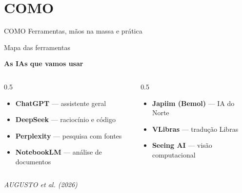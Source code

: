 \documentclass[11pt]{beamer}
\newcommand{\citabnt}[1]{%
	\vfill
	\begin{flushright}
		\tiny\textit{#1}
	\end{flushright}
}
\begin{document}
	\section{COMO}
	
	\begin{frame}{}
		\begin{center}
			\Huge COMO
			\vspace{1em}
			\normalsize
			Ferramentas, mãos na massa e prática
		\end{center}
	\end{frame}
	
	\begin{frame}{Mapa das ferramentas}
		\begin{center}
			\Large \textbf{As IAs que vamos usar}
		\end{center}
		\vspace{1em}
		\begin{columns}[T]
			\begin{column}{0.5\textwidth}
				\begin{itemize}
					\item \textbf{ChatGPT} — assistente geral
					\item \textbf{DeepSeek} — raciocínio e código
					\item \textbf{Perplexity} — pesquisa com fontes
					\item \textbf{NotebookLM} — análise de documentos
				\end{itemize}
			\end{column}
			\begin{column}{0.5\textwidth}
				\begin{itemize}
					\item \textbf{Japiim (Bemol)} — IA do Norte
					\item \textbf{VLibras} — tradução Libras
					\item \textbf{Seeing AI} — visão computacional
				\end{itemize}
			\end{column}
		\end{columns}
		\citabnt{AUGUSTO et al. (2026)}
	\end{frame}
	
\end{document}
